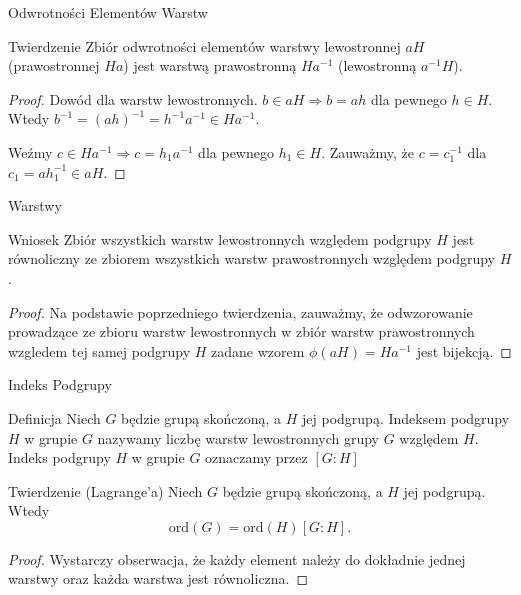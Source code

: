 \documentclass{beamer}
\newcommand{\ord}{\textrm{ord}}
\begin{document}
\begin{frame}{Odwrotności Elementów Warstw}
    \begin{block}{Twierdzenie}
        Zbiór odwrotności elementów warstwy lewostronnej $aH$ (prawostronnej $Ha$)
        jest warstwą prawostronną $Ha^{-1}$ (lewostronną $a^{-1}H$).
    \end{block}
    \pause
    \begin{proof}
        Dowód dla warstw lewostronnych. $b \in aH \Rightarrow b = ah$ dla pewnego $h \in H$.
        Wtedy $b^{-1} = (ah)^{-1} = h^{-1}a^{-1} \in Ha^{-1}$.

        Weźmy $c \in  Ha^{-1} \Rightarrow c = h_1a^{-1}$ dla pewnego $h_1 \in H$. Zauważmy, że $c = c_1^{-1}$ dla $c_1 = ah_1^{-1} \in aH$.
    \end{proof}
\end{frame}

\begin{frame}{Warstwy}
    \begin{block}{Wniosek}
        Zbiór wszystkich warstw lewostronnych względem podgrupy $H$ jest równoliczny
        ze zbiorem wszystkich warstw prawostronnych względem podgrupy $H$.
    \end{block}
    \begin{proof}
        Na podstawie poprzedniego twierdzenia, zauważmy, że odwzorowanie prowadzące ze zbioru warstw
        lewostronnych w zbiór warstw prawostronnych wzgledem tej samej podgrupy $H$ zadane wzorem
        $\phi(aH) = Ha^{-1}$ jest bijekcją.
    \end{proof}
\end{frame}

\begin{frame}{Indeks Podgrupy}
    \begin{block}{Definicja}
        Niech $G$ będzie grupą skończoną, a $H$ jej podgrupą. \alert{Indeksem podgrupy $H$} w grupie $G$
        nazywamy liczbę warstw lewostronnych grupy $G$ względem $H$. Indeks podgrupy $H$ w grupie $G$ oznaczamy przez $[G:H]$
    \end{block}
    \begin{block}{Twierdzenie (Lagrange'a)}
        Niech $G$ będzie grupą skończoną, a $H$ jej podgrupą. Wtedy 
        $$\ord(G) = \ord(H) [G:H].$$
    \end{block}
    \pause
    \begin{proof}
        Wystarczy obserwacja, że każdy element należy do dokładnie jednej warstwy oraz każda warstwa jest równoliczna.
    \end{proof}
\end{frame}
\end{document}
